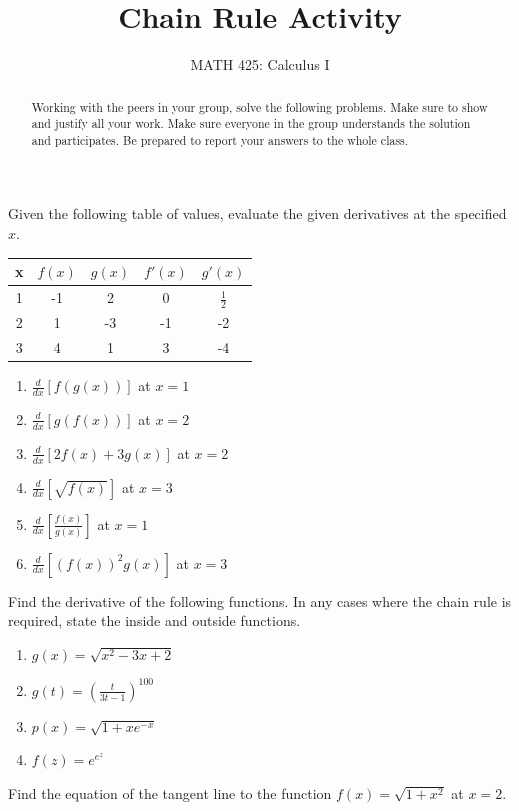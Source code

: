 \documentclass{ximera}
\title{Chain Rule Activity}  %
\author{MATH 425: Calculus I}
\begin{document}
\begin{abstract}
    Working with the peers in your group, solve the following problems. Make sure to show and justify all your work. Make sure everyone in the group understands the solution and participates. Be prepared to report your answers to the whole class. 
\end{abstract}
\maketitle


\begin{exercise}
    Given the following table of values, evaluate the given derivatives at the specified $x$.\\
    \begin{tabular}{c|c|c|c|c}
        x & $f(x)$ & $g(x)$ & $f'(x)$ & $g'(x)$  \\ \hline
        1 & -1 & 2 & 0 & $\frac{1}{2}$\\
        2 & 1 & -3 & -1 & -2 \\
        3 & 4 & 1 & 3 & -4 
    \end{tabular}
    \begin{enumerate}
        \item $\frac{d}{dx}[f(g(x))]$ at $x=1$
        \item $\frac{d}{dx}[g(f(x))]$ at $x=2$
        \item $\frac{d}{dx}[2f(x)+3g(x)]$ at $x=2$
        \item $\frac{d}{dx}[\sqrt{f(x)}]$ at $x=3$
        \item $\frac{d}{dx}[\frac{f(x)}{g(x)}]$ at $x=1$
        \item $\frac{d}{dx}[(f(x))^2g(x)]$ at $x=3$
    \end{enumerate}
\end{exercise}

\begin{exercise}
Find the derivative of the following functions. In any cases where the chain rule is required, state the inside and outside functions.
    \begin{enumerate}
        \item $g(x)=\sqrt{x^2-3x+2}$ 
        \item $g(t)=(\frac{t}{3t-1})^{100}$
        \item $p(x)=\sqrt{1+xe^{-x}}$
        \item $f(z)=e^{e^z}$
    \end{enumerate}
   
\end{exercise}

\begin{exercise}
    Find the equation of the tangent line to the function $f(x)=\sqrt{1+x^2}$ at $x=2$.
\end{exercise}
\end{document}
